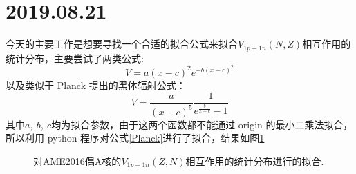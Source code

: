 \section{2019.08.21}
今天的主要工作是想要寻找一个合适的拟合公式来拟合$V_{1p-1n}(N,Z)$相互作用的统计分布，主要尝试了两类公式:
\begin{equation}
V=a(x-c)^2e^{-b(x-c)^2}\label{Yukawa}
\end{equation}
以及类似于 Planck 提出的黑体辐射公式：
\begin{equation}
	V=\frac{a}{(x-c)^5}\frac{1}{e^{\frac{b}{x-c}}-1} \label{Planck}
\end{equation}
其中$a,~b,~c$均为拟合参数，由于这两个函数都不能通过 origin 的最小二乘法拟合，所以利用 python 程序对公式\ref{Planck}进行了拟合，结果如图\ref{fig_Fit}
\begin{figure}[H]
\centering
{}
\qquad
{}
\caption{对AME2016偶A核的$V_{1p-1n}(Z,N)$相互作用的统计分布进行的拟合.\label{fig_Fit}}
\end{figure}
